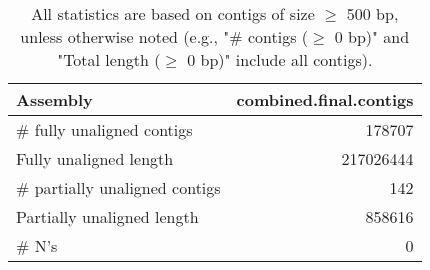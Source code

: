 \documentclass[12pt,a4paper]{article}
\begin{document}
\begin{table}[ht]
\begin{center}
\caption{All statistics are based on contigs of size $\geq$ 500 bp, unless otherwise noted (e.g., "\# contigs ($\geq$ 0 bp)" and "Total length ($\geq$ 0 bp)" include all contigs).}
\begin{tabular}{|l*{1}{|r}|}
\hline
Assembly & combined.final.contigs \\ \hline
\# fully unaligned contigs & 178707 \\ \hline
Fully unaligned length & 217026444 \\ \hline
\# partially unaligned contigs & 142 \\ \hline
Partially unaligned length & 858616 \\ \hline
\# N's & 0 \\ \hline
\end{tabular}
\end{center}
\end{table}
\end{document}
